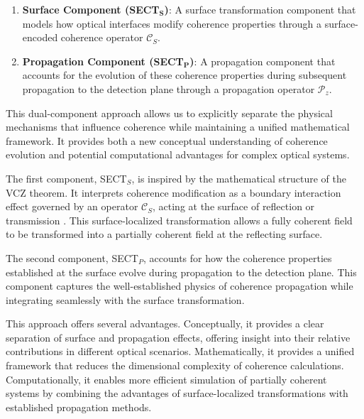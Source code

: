 \documentclass[a4paper,12pt]{article}
\begin{document}
\begin{enumerate}
    \item \textbf{Surface Component (SECT$_\mathbf{S}$)}: A surface transformation component that models how optical interfaces modify coherence properties through a surface-encoded coherence operator $\mathcal{C}_S$.
    
    \item \textbf{Propagation Component (SECT$_\mathbf{P}$)}: A propagation component that accounts for the evolution of these coherence properties during subsequent propagation to the detection plane through a propagation operator $\mathcal{P}_z$.
\end{enumerate}

This dual-component approach allows us to explicitly separate the physical mechanisms that influence coherence while maintaining a unified mathematical framework. It provides both a new conceptual understanding of coherence evolution and potential computational advantages for complex optical systems.

The first component, SECT$_S$, is inspired by the mathematical structure of the VCZ 
theorem. It interprets coherence modification as a boundary interaction effect governed by an operator \( \mathcal{C}_S \), 
acting at the surface of reflection or transmission \cite{friberg1982gsm}. This surface-localized transformation allows a fully coherent field to be transformed into a partially coherent field at the reflecting surface.

The second component, SECT$_P$, accounts for how the coherence properties established at the surface 
evolve during propagation to the detection plane. This component captures the well-established physics of coherence propagation 
while integrating seamlessly with the surface transformation.

This approach offers several advantages. Conceptually, it provides a clear separation of surface and propagation effects, offering insight into their relative contributions in different optical scenarios. Mathematically, it provides a unified framework that reduces the dimensional complexity of coherence calculations. Computationally, it enables more efficient simulation of partially coherent systems by combining the advantages of surface-localized transformations with established propagation methods.

\vspace{0.3cm}
\end{document}

